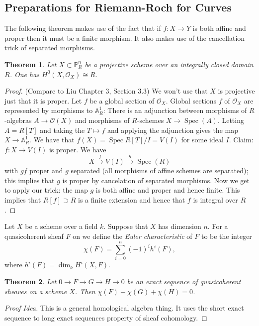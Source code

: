 \documentclass[12pt]{article}
\numberwithin{equation}{section}
\newtheorem{theorem}{Theorem}[subsection]
\theoremstyle{definition}
\theoremstyle{remark}
\newcommand{\Ocal}{\mathcal{O}}
\newcommand{\PP}{\mathbb{P}}
\renewcommand{\AA}{\mathbb{A}}
\newcommand{\Spec}{\operatorname{Spec}}
\newcommand{\pr}{\operatorname{pr}}
\begin{document}
\subsection{Preparations for Riemann-Roch for Curves}
The following theorem makes use of the fact that if $f:X\to Y$ is both affine and proper then it must be a finite morphism. 
It also makes use of the cancellation trick of separated morphisms.
\begin{theorem}
	Let $X \subset \PP^n_R$ be a projective scheme over an integrally closed domain $R$. 
	One has $H^0(X,\Ocal_X)\cong R$. 
\end{theorem}
\begin{proof} (Compare to Liu Chapter 3, Section 3.3)
	We won't use that $X$ is projective just that it is proper.
	Let $f$ be a global section of $\Ocal_X$.
	Global sections $f$ of $\Ocal_X$ are represented by morphisms to $\AA^1_R$:
	There is an adjunction between morphisms of $R$-algebras $A\to \Ocal(X)$ and morphisms of $R$-schemes $X\to \Spec(A)$. 
	Letting $A=R[T]$ and taking the $T\mapsto f$ and applying the adjunction gives the map $X \to \AA^1_R$.	
	We have that $f(X) = \Spec R[T]/I = V(I)$ for some ideal $I$. 
	Claim: $f: X \to V(I)$ is proper. We have 
	$$ X\xrightarrow{f} V(I) \xrightarrow{g} \Spec(R) $$
	with $gf$ proper and $g$ separated (all morphisms of affine schemes are separated); this implies that $g$ is proper by cancelation of separated morphisms.
	Now we get to apply our trick: the map $g$ is both affine and proper and hence finite. 
	This implies that $R[f] \supset R$ is a finite extension and hence that $f$ is integral over $R$.
	
	

\end{proof}

Let $X$ be a scheme over a field $k$. 
Suppose that $X$ has dimension $n$. 
For a quasicoherent sheaf $F$ on we define the \emph{Euler characteristic} of $F$ to be the integer
$$ \chi(F) = \sum_{i=0}^n (-1)^i h^i(F), $$
where $h^i(F) = \dim_k H^i(X,F)$.
\begin{theorem}
	Let $0\to F \to G \to H \to 0$ be an exact sequence of quasicoherent sheaves on a scheme $X$. 
	Then $\chi(F) - \chi(G) + \chi(H)=0$.
\end{theorem}
\begin{proof}[Proof Idea]
	This is a general homological algebra thing. 
	It uses the short exact sequence to long exact sequences property of sheaf cohomology. 
\end{proof}
\end{document}
